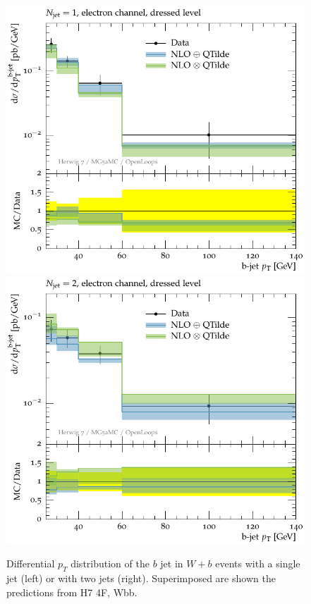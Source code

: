 \documentclass[11pt]{cernrep}
\newcommand{\Herwig}{H\protect\scalebox{0.8}{ERWIG}7\xspace}
\newcommand{\pt}{\ensuremath{p_{T}}\xspace}
\begin{document}
\begin{figure}[htbp]
\begin{center}
   \includegraphics[scale=0.65]{figs/wbb/herwig/atlas-d02-x01-y02.pdf}
   \includegraphics[scale=0.65]{figs/wbb/herwig/atlas-d02-x02-y02.pdf}
\end{center}
\caption{Differential \pt distribution of the $b$ jet in $W+b$ events with a
  single jet (left) or with two jets (right). Superimposed are shown the
  predictions from \Herwig 4F, Wbb.}
\label{wbb-pt-herwig}
\end{figure}
\end{document}
